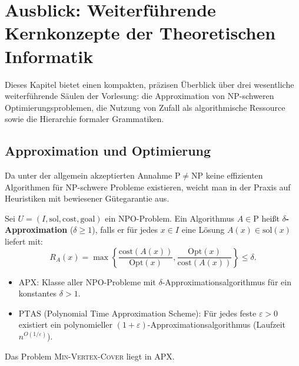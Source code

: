 \section{Ausblick: Weiterführende Kernkonzepte der Theoretischen Informatik}

Dieses Kapitel bietet einen kompakten, präzisen Überblick über drei wesentliche weiterführende Säulen der Vorlesung: die Approximation von NP-schweren Optimierungsproblemen, die Nutzung von Zufall als algorithmische Ressource sowie die Hierarchie formaler Grammatiken.

\subsection{Approximation und Optimierung}

Da unter der allgemein akzeptierten Annahme $\mathrm{P} \neq \mathrm{NP}$ keine effizienten Algorithmen für NP-schwere Probleme existieren, weicht man in der Praxis auf Heuristiken mit bewiesener Gütegarantie aus.

\begin{definition}
    Sei $U = (I, \mathrm{sol}, \mathrm{cost}, \mathrm{goal})$ ein NPO-Problem. Ein Algorithmus $A \in \mathrm{P}$ heißt \textbf{$\delta$-Approximation} ($\delta \ge 1$), falls er für jedes $x \in I$ eine Lösung $A(x) \in \mathrm{sol}(x)$ liefert mit:
    \[
        R_A(x) = \max \left\{ \frac{\mathrm{cost}(A(x))}{\mathrm{Opt}(x)}, \frac{\mathrm{Opt}(x)}{\mathrm{cost}(A(x))} \right\} \le \delta.
    \]
    \begin{itemize}
        \item $\mathrm{APX}$: Klasse aller NPO-Probleme mit $\delta$-Approximationsalgorithmus für ein konstantes $\delta > 1$.
        \item $\mathrm{PTAS}$ (Polynomial Time Approximation Scheme): Für jedes feste $\varepsilon > 0$ existiert ein polynomieller $(1+\varepsilon)$-Approximationsalgorithmus (Laufzeit $n^{O(1/\varepsilon)}$).
    \end{itemize}
\end{definition}

\begin{theorem}
    Das Problem \textsc{Min-Vertex-Cover} liegt in $\mathrm{APX}$.
\end{theorem}


